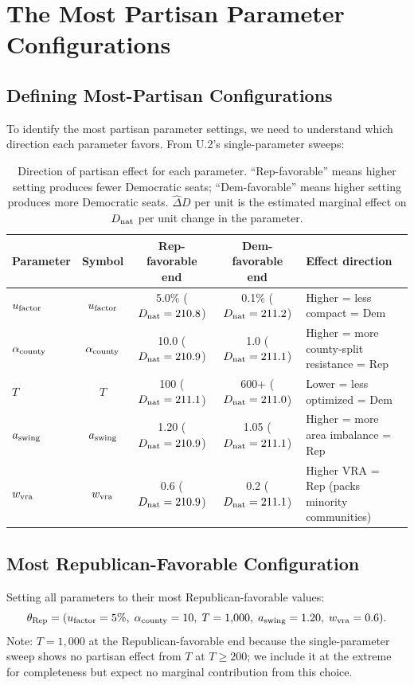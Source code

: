 \section{The Most Partisan Parameter Configurations}
\label{sec:most-partisan}

\subsection{Defining Most-Partisan Configurations}

To identify the most partisan parameter settings, we need to understand
which direction each parameter favors.
From U.2's single-parameter sweeps:

\begin{table}[h]
\centering
\caption{Direction of partisan effect for each parameter.
         ``Rep-favorable'' means higher setting produces fewer Democratic seats;
         ``Dem-favorable'' means higher setting produces more Democratic seats.
         $\hat{\Delta}D$ per unit is the estimated marginal effect on $D_{\mathrm{nat}}$
         per unit change in the parameter.}
\label{tab:param-direction}
\begin{tabular}{lcccl}
\toprule
Parameter & Symbol & Rep-favorable end & Dem-favorable end & Effect direction \\
\midrule
$u_{\mathrm{factor}}$ & $u_{\rm factor}$ & 5.0\% ($D_{\mathrm{nat}} = 210.8$) & 0.1\% ($D_{\mathrm{nat}} = 211.2$) & Higher = less compact = Dem \\
$\alpha_{\mathrm{county}}$ & $\alpha_{\rm county}$ & 10.0 ($D_{\mathrm{nat}} = 210.9$) & 1.0 ($D_{\mathrm{nat}} = 211.1$) & Higher = more county-split resistance = Rep \\
$T$ & $T$ & 100 ($D_{\mathrm{nat}} = 211.1$) & 600+ ($D_{\mathrm{nat}} = 211.0$) & Lower = less optimized = Dem \\
$a_{\mathrm{swing}}$ & $a_{\rm swing}$ & 1.20 ($D_{\mathrm{nat}} = 210.9$) & 1.05 ($D_{\mathrm{nat}} = 211.1$) & Higher = more area imbalance = Rep \\
$w_{\mathrm{vra}}$ & $w_{\rm vra}$ & 0.6 ($D_{\mathrm{nat}} = 210.9$) & 0.2 ($D_{\mathrm{nat}} = 211.1$) & Higher VRA = Rep (packs minority communities) \\
\bottomrule
\end{tabular}
\end{table}

\subsection{Most Republican-Favorable Configuration}

Setting all parameters to their most Republican-favorable values:
\[
  \theta_{\rm Rep} = (u_{\mathrm{factor}} = 5\%, \; \alpha_{\mathrm{county}} = 10, \; T = 1{,}000,
  \; a_{\mathrm{swing}} = 1.20, \; w_{\mathrm{vra}} = 0.6).
\]
Note: $T = 1{,}000$ at the Republican-favorable end because the single-parameter
sweep shows no partisan effect from $T$ at $T \geq 200$; we include it at the
extreme for completeness but expect no marginal contribution from this choice.

